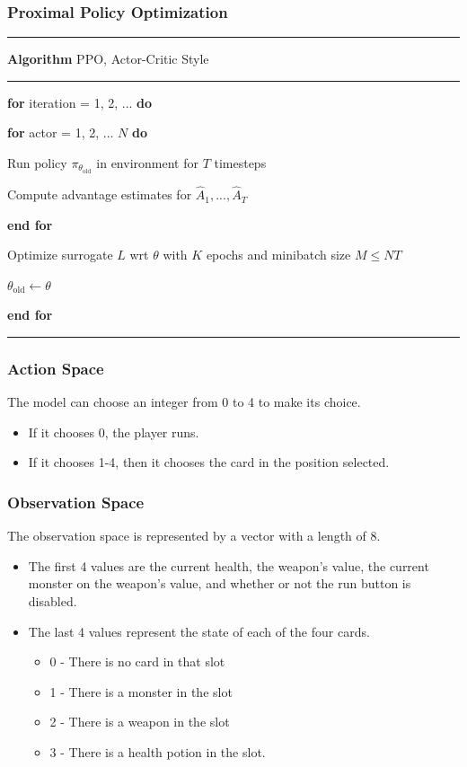\documentclass[
	11pt,
]{beamer}
\begin{document}
\begin{frame}
  \small
  \frametitle{Proximal Policy Optimization}
  \hrule
  \vspace{4pt}
  \textbf{Algorithm} PPO, Actor-Critic Style
  \vspace{4pt}
  \hrule
  \vspace{4pt}
  \textbf{for} iteration = 1, 2, ... \textbf{do}

  \hspace{2em} \textbf{for} actor = 1, 2, ... $N$ \textbf{do}

  \hspace{4em} Run policy $\pi_{\theta_\text{old}}$ in environment for $T$ timesteps

  \hspace{4em} Compute advantage estimates for $\hat{A}_1, ..., \hat{A}_T$

  \hspace{2em} \textbf{end for}

  \hspace{2em} Optimize surrogate $L$ wrt $\theta$ with $K$ epochs and minibatch size $M \le NT$

  \hspace{2em} $\theta_\text{old} \leftarrow \theta$

  \textbf{end for}
  \vspace{4pt}
  \hrule
\end{frame}

\begin{frame}
  \frametitle{Action Space}
  The model can choose an integer from 0 to 4 to make its choice.
  \begin{itemize}
    \item If it chooses 0, the player runs.
    \item If it chooses 1-4, then it chooses the card in the position selected.
  \end{itemize}
\end{frame}

\begin{frame}
  \frametitle{Observation Space}
  The observation space is represented by a vector with a length of 8.
  \begin{itemize}
    \item The first 4 values are the current health, the weapon's value, the current monster on the weapon's value, and whether or not the run button is disabled.
    \item The last 4 values represent the state of each of the four cards.
      \begin{itemize}
        \item 0 - There is no card in that slot
        \item 1 - There is a monster in the slot
        \item 2 - There is a weapon in the slot
        \item 3 - There is a health potion in the slot.
      \end{itemize}
  \end{itemize}
\end{frame}
\end{document}
